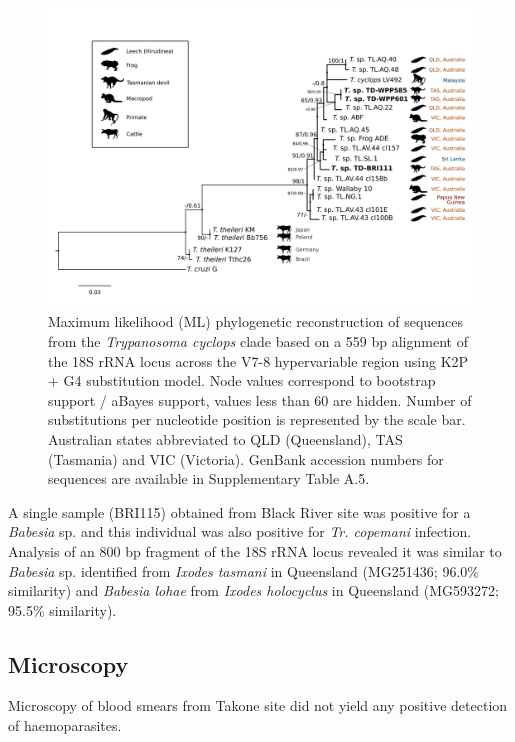 \documentclass[a4paper, nobind]{templates/ociamthesis}
\begin{document}
\begin{figure}
\includegraphics[width=0.95\linewidth]{figures/ms-figs/Ch6-Fig4} \caption[Phylogenetic tree of \textit{Tr. cyclops} clade (18S rDNA, v7-8 region) from the Tasmanian devil.]{Maximum likelihood (ML) phylogenetic reconstruction of sequences from the \textit{Trypanosoma cyclops} clade based on a 559 bp alignment of the 18S rRNA locus across the V7-8 hypervariable region using K2P + G4 substitution model. Node values correspond to bootstrap support / aBayes support, values less than 60 are hidden. Number of substitutions per nucleotide position is represented by the scale bar. Australian states abbreviated to QLD (Queensland), TAS (Tasmania) and VIC (Victoria). GenBank accession numbers for sequences are available in Supplementary Table A.5.}\label{fig:F64}
\end{figure}

A single sample (BRI115) obtained from Black River site was positive for a \emph{Babesia} sp. and this individual was also positive for \emph{Tr. copemani} infection. Analysis of an 800 bp fragment of the 18S rRNA locus revealed it was similar to \emph{Babesia} sp. identified from \emph{Ixodes tasmani} in Queensland (MG251436; 96.0\% similarity) and \emph{Babesia lohae} from \emph{Ixodes holocyclus} in Queensland (MG593272; 95.5\% similarity).

\hypertarget{microscopy}{%
\subsection{Microscopy}\label{microscopy}}

Microscopy of blood smears from Takone site did not yield any positive detection of haemoparasites.
\end{document}

